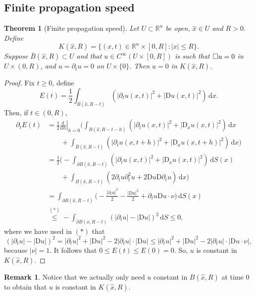 \documentclass[a4paper,9pt]{amsart}
\newcommand{\R}{\mathbb{R}}	%
\newcommand{\dd}{\mathrm{d}}	%
\newcommand{\did}{\,\mathrm{d}}	%
\newcommand{\de}{\partial}		%
\newcommand{\Diff}{\mathrm{D}}
\theoremstyle{plain}
\newtheorem{theorem}[proposition]{Theorem}
\theoremstyle{definition}
\newtheorem{remark}[proposition]{Remark}
\theoremstyle{remark}
\begin{document}
\subsection{Finite propagation speed}\label{subs67ce9a17}
\begin{theorem}[Finite propagation speed]\label{thm67ce9a24}
	Let $U\subset \R^n$ be open, $\hat x\in U$ and $R>0$.
	Define
	\begin{equation}
		K(\hat x,R) = \{ (x,t)\in\R^n\times [0,R] : |x|\le R \} .
	\end{equation}
	Suppose $\bar B(\hat x,R)\subset U$ and that $u\in C^\infty(U\times[0,R])$ is such that
	$\square u = 0$ in $U\times(0,R)$,
	and $u=\de_tu =0 $ on $U\times\{0\}$.
	Then $u= 0$ in $K(\hat x,R)$.
\end{theorem}
\begin{proof}
	Fix $t\ge 0$, define 
	\begin{equation}
		E(t) = \frac12 \int_{B(\hat x,R-t)} (|\de_tu(x,t)|^2 + |\Diff u(x,t)|^2 ) \did x .
	\end{equation}
	Then, if $t\in (0,R)$,
	\begin{align*}
	 	\de_t E(t) 
		&= \frac12 \left.\frac{\dd}{\dd h}\right|_{h=0}
			\bigg( \int_{B(\hat x,R-t-h)} (|\de_tu(x,t)|^2 + |\Diff_xu(x,t)|^2 ) \did x
		\\&\qquad
				+ \int_{B(\hat x,R-t)} (|\de_tu(x,t+h)|^2 + |\Diff_xu(x,t+h)|^2 ) \did x 
			\bigg) \\
		&= \frac12 \bigg( - \int_{\de B(\hat x,R-t)} (|\de_tu(x,t)|^2 + |\Diff_xu(x,t)|^2 ) \did S(x)
		\\&\qquad
			+ \int_{B(\hat x, R-t)} (2\de_tu\de_t^2u + 2\Diff u \Diff\de_t u) \did x 
			\bigg) \\
		&= \int_{\de B(\hat x,R-t)} \bigg( - \frac{|\de_tu|^2}{2} - \frac{|\Diff u|^2}{2} + \de_t u \Diff u\cdot \nu \bigg) \did S(x) \\
		&\overset{(*)}\le  -\int_{\de B(x,R-t)} (|\de_tu|-|\Diff u|)^2 \did S
		\le 0 ,
	\end{align*}
	where we have used in $(*)$ that
	\begin{equation}
		(|\de_tu|-|\Diff u|)^2
		= |\de_tu|^2 + |\Diff u|^2 - 2 |\de_tu|\cdot|\Diff u|
		\le |\de_tu|^2 + |\Diff u|^2 - 2 |\de_tu|\cdot|\Diff u\cdot \nu|,
	\end{equation}
	because $|\nu|=1$.
	It follows that $0\le E(t) \le E(0) = 0$.
	So, $u$ is constant in $K(\hat x,R)$.
\end{proof}
\begin{remark}
	Notice that we actually only need $u$ constant in $B(\hat x,R)$ at time $0$ to obtain that $u$ is constant in $K(\hat x,R)$.
\end{remark}
\end{document}
